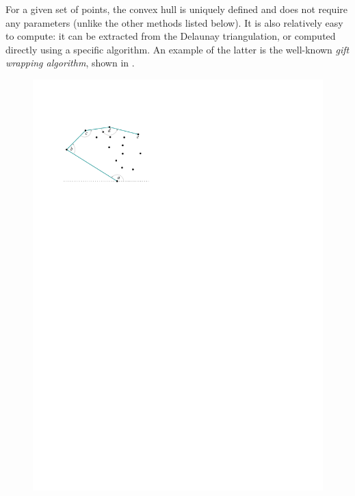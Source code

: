 For a given set of points, the convex hull is uniquely defined and does not require any parameters (unlike the other methods listed below).
It is also relatively easy to compute: it can be extracted from the Delaunay triangulation, or computed directly using a specific algorithm.
An example of the latter is the well-known \emph{gift wrapping algorithm}, shown in .
\begin{marginfigure}
  \centering
  \begin{subfigure}[b]{\linewidth}
    \centering
    \includegraphics[page=1,width=\textwidth]{figs/giftwrapping.pdf}
    \caption{}
  \end{subfigure}
  \qquad
  \begin{subfigure}[b]{\linewidth}
    \centering

\end{subfigure}
\end{marginfigure}

